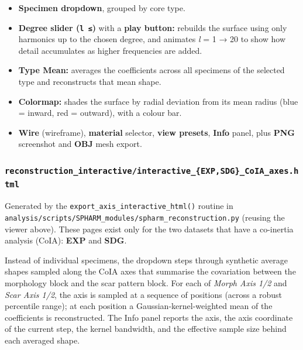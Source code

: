\documentclass[
  letterpaper,
  DIV=11,
  numbers=noendperiod]{scrartcl}
\providecommand{\tightlist}{%
  \setlength{\itemsep}{0pt}\setlength{\parskip}{0pt}}
\begin{document}
\begin{itemize}
\tightlist
\item
  \textbf{Specimen dropdown}, grouped by core type.
\item
  \textbf{Degree slider (\texttt{l\ ≤})} with a \textbf{play button:}
  rebuilds the surface using only harmonics up to the chosen degree, and
  animates \emph{l} = 1 → 20 to show how detail accumulates as higher
  frequencies are added.
\item
  \textbf{Type Mean:} averages the coefficients across all specimens of
  the selected type and reconstructs that mean shape.
\item
  \textbf{Colormap:} shades the surface by radial deviation from its
  mean radius (blue = inward, red = outward), with a colour bar.
\item
  \textbf{Wire} (wireframe), \textbf{material} selector, \textbf{view
  presets}, \textbf{Info} panel, plus \textbf{PNG} screenshot and
  \textbf{OBJ} mesh export.
\end{itemize}

\subsubsection{\texorpdfstring{\texttt{reconstruction\_interactive/interactive\_\{EXP,SDG\}\_CoIA\_axes.html}}{reconstruction\_interactive/interactive\_\{EXP,SDG\}\_CoIA\_axes.html}}\label{reconstruction_interactiveinteractive_expsdg_coia_axes.html}

Generated by the \texttt{export\_axis\_interactive\_html()} routine in
\texttt{analysis/scripts/SPHARM\_modules/spharm\_reconstruction.py}
(reusing the viewer above). These pages exist only for the two datasets
that have a co-inertia analysis (CoIA): \textbf{EXP} and \textbf{SDG}.

Instead of individual specimens, the dropdown steps through synthetic
average shapes sampled along the CoIA axes that summarise the
covariation between the morphology block and the scar pattern block. For
each of \emph{Morph Axis 1/2} and \emph{Scar Axis 1/2}, the axis is
sampled at a sequence of positions (across a robust percentile range);
at each position a Gaussian-kernel-weighted mean of the coefficients is
reconstructed. The Info panel reports the axis, the axis coordinate of
the current step, the kernel bandwidth, and the effective sample size
behind each averaged shape.
\end{document}
